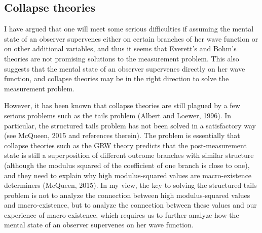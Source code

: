 


\subsection{Collapse theories}

I have argued that one will meet some serious difficulties if assuming the mental state of an observer supervenes either on certain branches of her wave function or on other additional variables, and thus it seems that Everett's and Bohm's theories are not promising solutions to the measurement problem.
This also suggests that the mental state of an observer supervenes directly on her wave function, and 
collapse theories may be in the right direction to solve the measurement problem.

However, it has been known that collapse theories are still plagued by a few serious problems such as the tails problem (Albert and Loewer, 1996). In particular, the structured tails problem has not been solved in a satisfactory way (see McQueen, 2015 and references therein).
The problem is essentially that collapse theories such as the GRW theory predicts that the post-measurement state is still a superposition of different outcome branches with similar structure (although the modulus squared of the coefficient of one branch is close to one), and they need to explain why high modulus-squared values are macro-existence determiners (McQueen, 2015).
In my view, the key to solving the structured tails problem is not to analyze the connection between high modulus-squared values and macro-existence, but to analyze the connection between these values and our experience of macro-existence, which requires us to further analyze how the mental state of an observer supervenes on her wave function.


